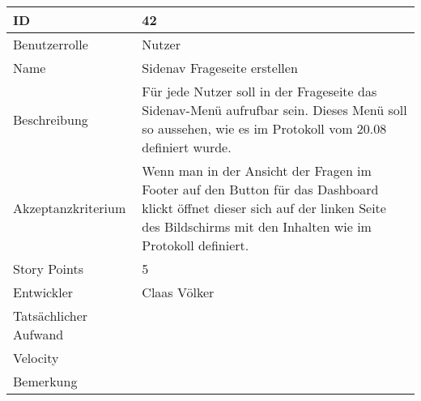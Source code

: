 \begin{tabularx}{\textwidth}{|p{}|X|}
	\hline
	ID & 42 \\
	\hline
	Benutzerrolle & Nutzer \\
	\hline
	Name & Sidenav Frageseite erstellen\\
	\hline
	Beschreibung & Für jede Nutzer soll in der Frageseite das Sidenav-Menü aufrufbar sein. Dieses Menü soll so aussehen, wie es im Protokoll vom 20.08 definiert wurde.\\
	\hline
	Akzeptanzkriterium & Wenn man in der Ansicht der Fragen im Footer auf den Button für das Dashboard klickt öffnet dieser sich auf der linken Seite des Bildschirms mit den Inhalten wie im Protokoll definiert. \\
	\hline
	Story Points & 5\\
	\hline
	Entwickler & Claas Völker\\
	\hline
	\hline
	Tatsächlicher Aufwand & \\
	\hline
	Velocity & \\
	\hline
	Bemerkung & \\
	\hline
\end{tabularx}
\vspace{20pt}
